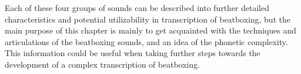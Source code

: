Each of these four groups of sounds can be described into further detailed characteristics and potential utilizability in transcription of beatboxing, but the main purpose of this chapter is mainly to get acquainted with the techniques and articulations of the beatboxing sounds, and an idea of the phonetic complexity. This information could be useful when taking further steps towards the development of a complex transcription of beatboxing.
